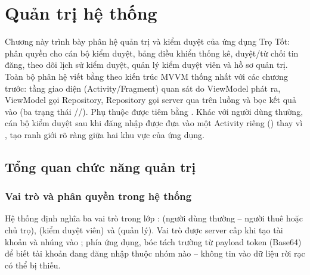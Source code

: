 
\chapter{Quản trị hệ thống}

Chương này trình bày phân hệ quản trị và kiểm duyệt của ứng dụng Trọ Tốt:
phân quyền cho cán bộ kiểm duyệt, bảng điều khiển thống kê, duyệt/từ chối tin
đăng, theo dõi lịch sử kiểm duyệt, quản lý kiểm duyệt viên và hồ sơ quản trị.
Toàn bộ phân hệ viết bằng  theo kiến trúc MVVM thống nhất với các
chương trước: tầng giao diện (Activity/Fragment) quan sát  do
ViewModel phát ra, ViewModel gọi Repository, Repository gọi server qua
 trên luồng  và bọc kết quả vào 
(ba trạng thái //). Phụ thuộc được tiêm
bằng . Khác với người dùng thường, cán bộ kiểm duyệt sau khi đăng
nhập được đưa vào một Activity riêng () thay vì
, tạo ranh giới rõ ràng giữa hai khu vực của ứng dụng.

\section{Tổng quan chức năng quản trị}

\subsection{Vai trò và phân quyền trong hệ thống}
Hệ thống định nghĩa ba vai trò trong lớp : 
(người dùng thường -- người thuê hoặc chủ trọ),  (kiểm duyệt
viên) và  (quản lý). Vai trò được server cấp khi tạo tài khoản và
nhúng vào ; phía ứng dụng,  bóc tách
trường  từ payload token (Base64) để biết tài khoản đang đăng
nhập thuộc nhóm nào -- không tin vào dữ liệu rời rạc có thể bị thiếu.

